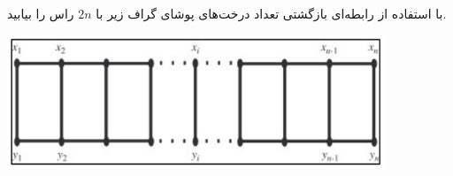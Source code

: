 \EXERCISE
با استفاده از رابطه‌ای بازگشتی تعداد درخت‌های پوشای گراف زیر با
$2n$
راس را بیابید.
\begin{center}
\includegraphics[height=4cm]{25.png}
\end{center}